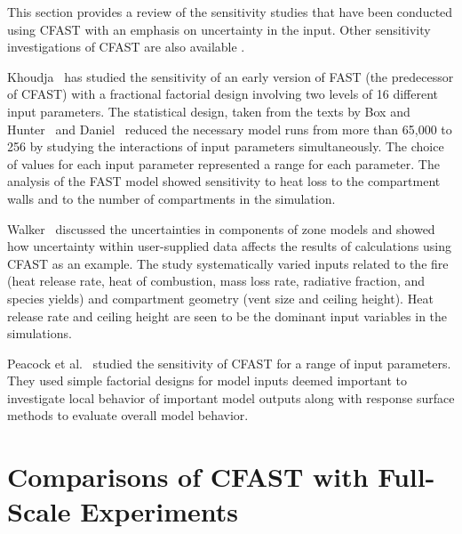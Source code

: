 This section provides a review of the sensitivity studies that have been conducted using CFAST with an emphasis on uncertainty in the input. Other sensitivity investigations of CFAST are also available \cite{Peacock:1988a, Beard:1992, Notarianni:2000}.

Khoudja~\cite{Khoudja:1988} has studied the sensitivity of an early version of FAST (the predecessor of CFAST) with a fractional factorial design involving two levels of 16 different input parameters. The statistical design, taken from the texts by Box and Hunter~\cite{Box:1978} and Daniel~\cite{Daniel:1976} reduced the necessary model runs from more than 65,000 to 256 by studying the interactions of input parameters simultaneously. The choice of values for each input parameter represented a range for each parameter. The analysis of the FAST model showed sensitivity to heat loss to the compartment walls and to the number of compartments in the simulation.

Walker~\cite{Walker:1997} discussed the uncertainties in components of zone models and showed how uncertainty within user-supplied data affects the results of calculations using CFAST as an example. The study systematically varied inputs related to the fire (heat release rate, heat of combustion, mass loss rate, radiative fraction, and species yields) and compartment geometry (vent size and ceiling height). Heat release rate and ceiling height are seen to be the dominant input variables in the simulations.

Peacock et al.~\cite{Peacock:1988a} studied the sensitivity of CFAST for a range of input parameters. They used simple factorial designs for model inputs deemed important to investigate local behavior of important model outputs along with response surface methods to evaluate overall model behavior.


\section{Comparisons of CFAST with Full-Scale Experiments}

